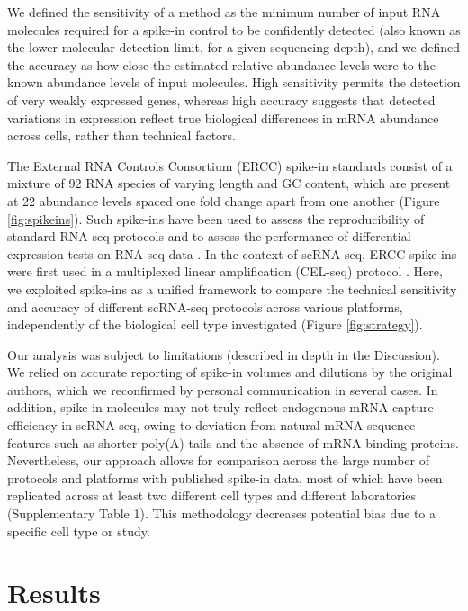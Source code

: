 We defined the sensitivity of a method as the minimum number of input RNA molecules required for a spike-in control to be confidently detected (also known as the lower molecular-detection limit, for a given sequencing depth), and we defined the accuracy as how close the estimated relative abundance levels were to the known abundance levels of input molecules. High sensitivity permits the detection of very weakly expressed genes, whereas high accuracy suggests that detected variations in expression reflect true biological differences in mRNA abundance across cells, rather than technical factors.

The External RNA Controls Consortium (ERCC) \cite{External_RNA_Controls_Consortium2005-qi} spike-in standards consist of a mixture of 92 RNA species of varying length and GC content, which are present at 22 abundance levels spaced one fold change apart from one another (Figure \ref{fig:spikeins}). Such spike-ins have been used to assess the reproducibility of standard RNA-seq protocols \cite{Jiang2011-nc} and to assess the performance of differential expression tests on RNA-seq data  \cite{Munro2014-tu}. In the context of scRNA-seq, ERCC spike-ins were first used in a multiplexed linear amplification (CEL-seq) protocol \cite{Hashimshony2012-am}. Here, we exploited spike-ins as a unified framework to compare the technical sensitivity and accuracy of different scRNA-seq protocols across various platforms, independently of the biological cell type investigated (Figure \ref{fig:strategy}).

Our analysis was subject to limitations (described in depth in the Discussion). We relied on accurate reporting of spike-in volumes and dilutions by the original authors, which we reconfirmed by personal communication in several cases. In addition, spike-in molecules may not truly reflect endogenous mRNA capture efficiency in scRNA-seq, owing to deviation from natural mRNA sequence features such as shorter poly(A) tails and the absence of mRNA-binding proteins. Nevertheless, our approach allows for comparison across the large number of protocols and platforms with published spike-in data, most of which have been replicated across at least two different cell types and different laboratories (Supplementary Table 1). This methodology decreases potential bias due to a specific cell type or study.

\section{Results}

